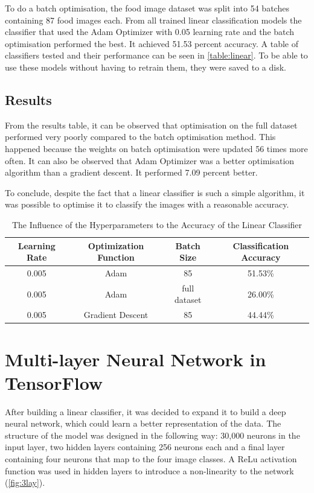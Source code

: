 To do a batch optimisation, the food image dataset was split into 54 batches containing 87 food images each. From all trained linear classification models the classifier that used the Adam Optimizer with 0.05 learning rate and the batch optimisation performed the best. It achieved 51.53 percent accuracy. A table of classifiers tested and their performance can be seen in \autoref{table:linear}. To be able to use these models without having to retrain them, they were saved to a disk.


\subsection{Results}
From the results table, it can be observed that optimisation on the full dataset performed very poorly compared to the batch optimisation method.  This happened because the weights on batch optimisation were updated 56 times more often. It can also be observed that Adam Optimizer was a better optimisation algorithm than a gradient descent. It performed 7.09 percent better. 

To conclude, despite the fact that a linear classifier is such a simple algorithm, it was possible to optimise it to classify the images with a reasonable accuracy.

\begin{table}[h]
\begin{center}
\begin{tabular}{ |c|c|c|c| } 
 \hline
 Learning Rate &   Optimization Function & Batch Size & Classification Accuracy \\   \hline
0.005    &   Adam   &  85  & 51.53\% \\
0.005    &   Adam &  full dataset  & 26.00\% \\
0.005    &   Gradient Descent   &  85  & 44.44\% \\ 
 \hline
\end{tabular}
\caption{The Influence of the Hyperparameters to the Accuracy of the Linear Classifier }
\label{table:linear}
\end{center}
\end{table}

\section{Multi-layer Neural Network in TensorFlow}

After building a linear classifier, it was decided to expand it to build a deep neural network, which could learn a better representation of the data. The structure of the model was designed in the following way: 30,000 neurons in the input layer, two hidden layers containing 256 neurons each and a final layer containing four neurons that map to the four image classes. A ReLu activation function was used in hidden layers to introduce a non-linearity to the network (\autoref{fig:3lay}). 

